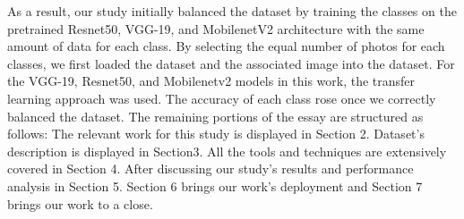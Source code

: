 As a result, our study initially balanced the dataset by training the classes on the pretrained Resnet50, VGG-19, and MobilenetV2 architecture with the same amount of data for each class. By selecting the equal number of photos for each classes, we first loaded the dataset and the associated image into the dataset. For the VGG-19, Resnet50, and Mobilenetv2 models in this work, the transfer learning approach was used. The accuracy of each class rose once we correctly balanced the dataset. The remaining portions of the essay are structured as follows: The relevant work for this study is displayed in Section 2. Dataset’s description is displayed in Section3. All the tools and techniques are extensively covered in Section 4. After discussing our study’s results and performance analysis in Section 5. Section 6 brings our work's deployment and Section 7 brings our work to a close.



